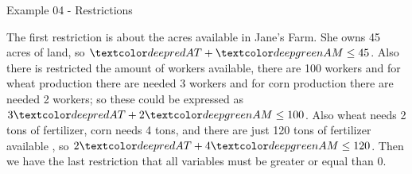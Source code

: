 \begin{frame}{Example 04 - Restrictions}

The first restriction is about the acres available in Jane's Farm. She owns 45
acres of land, so $\colora{AT} + \colorb{AM} \le 45$. Also there is restricted
the amount of workers available, there are 100 workers and for wheat production
there are needed 3 workers and for corn production there are needed 2 workers;
so these could be expressed as $3\colora{AT} + 2\colorb{AM} \le 100$.
Also wheat needs 2 tons of fertilizer, corn needs 4 tons, and there are just 120
tons of fertilizer available , so $2\colora{AT} + 4\colorb{AM} \le 120$. Then we
have the last restriction that all variables must be greater or equal than 0.

\end{frame}
